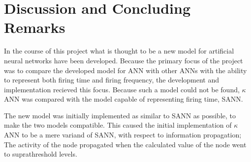 \section{Discussion and Concluding Remarks}
In the course of this project what is thought to be a new model for artificial neural networks have been developed. 
Because the primary focus of the project was to compare the developed model for ANN with other ANNs with the ability to represent both firing time and firing frequency, the development and implementation recieved this focus. 
Because such a model could not be found, $\kappa$ANN was compared with the model capable of representing firing time, SANN.

The new model was initially implemented as similar to SANN as possible, to make the two models compatible.
This caused the initial implementation of $\kappa$ANN to be a mere variand of SANN, with respect to information propagation;
	The activity of the node propagated when the calculated value of the node went to suprathreshold levels.

